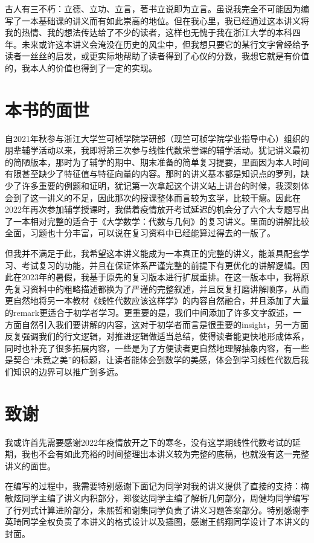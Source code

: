 古人有三不朽：立德、立功、立言，著书立说即为立言。虽说我完全不可能因为编写了一本基础课的讲义而有如此崇高的地位。但在我心里，我已经通过这本讲义将我的热情、我的想法传达给了不少的读者，这样也无愧于我在浙江大学的本科四年。未来或许这本讲义会淹没在历史的风尘中，但我想只要它的某行文字曾经给予读者一丝丝的启发，或更实际地帮助了读者得到了心仪的分数，我想它就是有价值的，我本人的价值也得到了一定的实现。

\section*{本书的面世}

自2021年秋参与浙江大学竺可桢学院学研部（现竺可桢学院学业指导中心）组织的朋辈辅学活动以来，我即将第三次参与线性代数荣誉课的辅学活动。犹记讲义最初的简陋版本，那时为了辅学的期中、期末准备的简单复习提要，里面因为本人时间有限甚至缺少了特征值与特征向量的内容。那时的讲义基本都是知识点的罗列，缺少了许多重要的例题和证明，犹记第一次拿起这个讲义站上讲台的时候，我深刻体会到了这一讲义的不足，因此那次的授课整体而言较为玄学，比较干瘪。因此在2022年再次参加辅学授课时，我借着疫情放开考试延迟的机会分了六个大专题写出了一本相对完整的适合于《大学数学：代数与几何》的复习讲义。里面的讲解比较全面，习题也十分丰富，可以说在复习资料中已经能算过得去的一版了。

但我并不满足于此，我希望这本讲义能成为一本真正的完整的讲义，能兼具配套学习、考试复习的功能，并且在保证体系严谨完整的前提下有更优化的讲解逻辑。因此在2023年的暑假，我基于原先的复习版本进行扩展重排。在这一版本中，我将原先复习资料中的粗略描述都换为了严谨的完整叙述，并且反复打磨讲解顺序，从而更自然地将另一本教材《线性代数应该这样学》的内容自然融合，并且添加了大量的remark更适合于初学者学习。更重要的是，我们中间添加了许多文字叙述，一方面自然引入我们要讲解的内容，这对于初学者而言是很重要的insight，另一方面反复强调我们的行文逻辑，对推进逻辑做适当总结，使得读者能更快地形成体系，同时也补充了很多拓展内容，一些是为了方便读者更自然地理解抽象内容，有一些是契合``未竟之美''的标题，让读者能体会到数学的美感，体会到学习线性代数后我们知识的边界可以推广到多远。

\section*{致谢}

我或许首先需要感谢2022年疫情放开之下的寒冬，没有这学期线性代数考试的延期，我也不会有如此充裕的时间整理出本讲义较为完整的底稿，也就没有这一完整讲义的面世。

在编写的过程中，我需要特别感谢下面记为同学对我的讲义提供了直接的支持：梅敏炫同学主编了讲义内积部分，郑俊达同学主编了解析几何部分，周健均同学编写了行列式计算进阶部分，朱熙哲和谢集同学负责了讲义习题答案部分。特别感谢李英琦同学全权负责了本讲义的格式设计以及插图，感谢王鹤翔同学设计了本讲义的封面。

